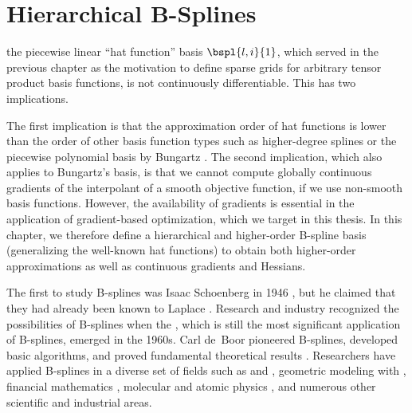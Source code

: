 
\chapter{Hierarchical B-Splines}
\label{chap:30BSplines}

the piecewise linear ``hat function'' basis $\bspl{l,i}{1}$,
which served in the previous chapter as the motivation
to define sparse grids for arbitrary tensor product basis functions,
is not continuously differentiable.
This has two implications.


The first implication is that the approximation order of hat functions
is lower than the order of other basis function types
such as higher-degree splines \cite{Sickel11Spline}
or the piecewise polynomial basis by Bungartz \cite{Bungartz98Finite}.
The second implication, which also applies to Bungartz's basis,
is that we cannot compute globally continuous gradients of the
interpolant of a smooth objective function,
if we use non-smooth basis functions.
However, the availability of gradients is
essential in the application of gradient-based optimization,
which we target in this thesis.
In this chapter, we therefore define a hierarchical and
higher-order B-spline basis
(generalizing the well-known hat functions)
to obtain both higher-order approximations
as well as continuous gradients and Hessians.

The first to study B-splines was Isaac Schoenberg in 1946
\cite{Schoenberg46Contributions},
but he claimed that they had already been known to Laplace
\cite{Boor76Splines}.
Research and industry recognized the possibilities of B-splines when
the \fem, which is still the most significant application of B-splines,
emerged in the 1960s.
Carl de~Boor pioneered B-splines, developed basic algorithms, and
proved fundamental theoretical results \cite{Boor72Calculating}.
Researchers have applied B-splines in a diverse set of fields such as
\fem \cite{Hoellig03Finite} and \iga \cite{Hoellig12Finite},
geometric modeling with \nurbs
{},
financial mathematics \cite{Pflueger10Spatially},
molecular and atomic physics
,
and numerous other scientific and industrial areas.

